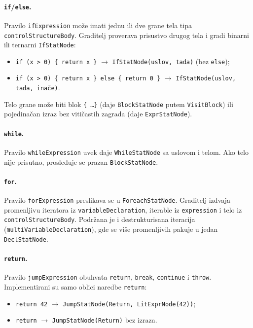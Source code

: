 \documentclass[a4paper]{article}
\begin{document}
\paragraph{\texttt{if}/\texttt{else}.}
Pravilo \texttt{ifExpression} može imati jednu ili dve grane tela tipa
\texttt{controlStructureBody}. Graditelj proverava prisustvo drugog tela i
gradi binarni ili ternarni \texttt{IfStatNode}:

\begin{itemize}
    \item \texttt{if (x > 0) \{ return x \}} $\to$
          \texttt{IfStatNode(uslov, tada)} (bez \texttt{else});
    \item \texttt{if (x > 0) \{ return x \} else \{ return 0 \}} $\to$
          \texttt{IfStatNode(uslov, tada, inače)}.
\end{itemize}

Telo grane može biti blok \texttt{\{ \ldots \}} (daje \texttt{BlockStatNode}
putem \texttt{VisitBlock}) ili pojedinačan izraz bez vitičastih zagrada (daje
\texttt{ExprStatNode}).

\paragraph{\texttt{while}.}
Pravilo \texttt{whileExpression} uvek daje \texttt{WhileStatNode} sa uslovom
i telom. Ako telo nije prisutno, prosleđuje se prazan \texttt{BlockStatNode}.

\paragraph{\texttt{for}.}
Pravilo \texttt{forExpression} preslikava se u \texttt{ForeachStatNode}.
Graditelj izdvaja promenljivu iteratora iz \texttt{variableDeclaration},
iterable iz \texttt{expression} i telo iz \texttt{controlStructureBody}.
Podržana je i destrukturisana iteracija (\texttt{multiVariableDeclaration}),
gde se više promenljivih pakuje u jedan \texttt{DeclStatNode}.

\paragraph{\texttt{return}.}
Pravilo \texttt{jumpExpression} obuhvata \texttt{return}, \texttt{break},
\texttt{continue} i \texttt{throw}. Implementirani su samo oblici naredbe
\texttt{return}:

\begin{itemize}
    \item \texttt{return 42} $\to$
          \texttt{JumpStatNode(Return, LitExprNode(42))};
    \item \texttt{return} $\to$
          \texttt{JumpStatNode(Return)} bez izraza.
\end{itemize}
\end{document}
